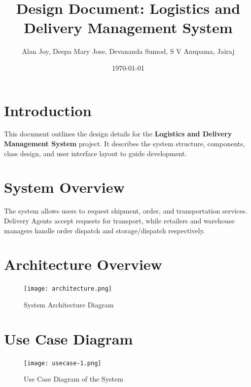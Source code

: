 \documentclass[12pt,a4paper]{article}
\title{\textbf{Design Document: Logistics and Delivery Management System}}
\author{Alan Joy, Deepa Mary Jose, Devananda Sumod, S V Anupama, Jairaj}
\date{\today}
\begin{document}
\maketitle

\section{Introduction}
This document outlines the design details for the \textbf{Logistics and Delivery Management System} project. It describes the system structure, components, class design, and user interface layout to guide development.

\section{System Overview}
The system allows users to request shipment, order, and transportation services. Delivery Agents accept requests for transport, while retailers and warehouse managers handle order dispatch and storage/dispatch respectively.

\section{Architecture Overview}
\begin{figure}[H]
    \centering
    \texttt{[image: architecture.png]} 
    \caption{System Architecture Diagram}
    \label{fig:architecture}
\end{figure}

\section{Use Case Diagram}
\begin{figure}[H]
    \centering
    \texttt{[image: usecase-1.png]}
    \caption{Use Case Diagram of the System}
    \label{fig:usecase}
\end{figure}
\end{document}
